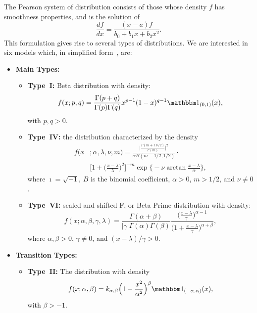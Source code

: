 \documentclass[journal]{IEEEtran}
\begin{document}
{The Pearson system of distribution consists of those whose density $f$ has smoothness properties, and is the solution of
$$
\frac{df}{dx} = 
\frac{(x-a)f}{b_0+b_1 x + b_2 x^2}.
$$
This formulation gives rise to several types of distributions.
We are interested in six models which, in simplified form~\cite[Table~6, p.~45]{SystemsofFrequencyCurves}, are:
\begin{itemize}
	\item \textbf{Main Types:}
	\begin{itemize}
		\item \textbf{Type~I:} Beta distribution with density:
		\begin{equation}
		f(x; p, q) = \frac{\Gamma(p+q)}{\Gamma(p)\Gamma(q)} x^{p-1} (1-x)^{q-1} \mathbbm 1_{(0,1)}(x),
		\label{eq:BetaDensity}
		\end{equation}
		with $p,q>0$.
		
		\item \textbf{Type~IV:} the distribution characterized by the density
		\begin{align*}
		f(x&;\alpha,\lambda,\nu,m) =
		\frac{\Big|
			\frac{\Gamma(m+\imath\nu/2)}{\Gamma(m)}
			\Big|^2} {\alpha B(m-1/2,1/2)}\cdot\\
	&	\Big[
		1+\Big(\frac{x-\lambda}{\lambda}
		\Big)^{2}
		\Big]^{-m} 
		\exp\Big\{-\nu\arctan\frac{x-\lambda}{\alpha}\Big\},
		\end{align*}
		where $\imath=\sqrt{-1}$,
		$B$ is the binomial coefficient,
		$\alpha>0$, 
		$m>1/2$, 
		and $\nu\neq0$.
		\item \textbf{Type~VI:} scaled and shifted F, or Beta Prime distribution with density:
		$$
		f(x;\alpha,\beta,\gamma,\lambda) = \frac{\Gamma(\alpha+\beta)}{|\gamma|\Gamma(\alpha) \Gamma(\beta)}
		\frac{
			\big(\frac{x-\lambda}{\gamma}\big)^{\alpha-1}
		}{
			\big(1+\frac{x-\lambda}{\gamma}\big)^{\alpha+\beta}
		},
		$$
		where $\alpha,\beta>0$, $\gamma\neq0$, and $(x-\lambda)/\gamma>0$.
		

	\end{itemize}
	\item \textbf{Transition Types:}
		\begin{itemize}
		\item \textbf{Type~II:} The distribution with density
	\begin{equation}
	f(x;\alpha,\beta) = k_{\alpha,\beta} \Big(
	1-\frac{x^2}{\alpha^2}
	\Big)^\beta \mathbbm 1_{(-\alpha,  \alpha)}(x),
	\label{eq:TypeIIDensity}
	\end{equation}
	with $\beta>-1$.


\end{itemize}
\end{itemize}}
\end{document}
